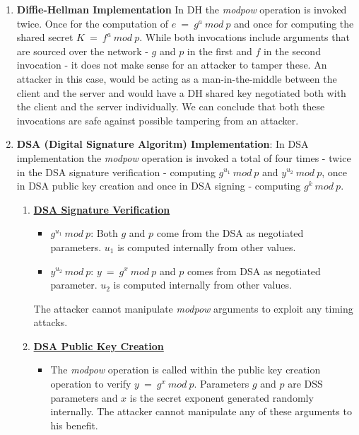 \documentclass{bhamthesis}
\begin{document}
\begin{enumerate}
    \item \textbf {Diffie-Hellman Implementation}
    In DH the \textit{modpow} operation is invoked twice. Once for the computation of \(e\ =\ g^a\ mod\ p\) and once for computing the shared secret \(K\ =\ f^a\ mod\ p\). While both invocations include arguments that are sourced over the network - \(g\) and \(p\) in the first and \(f\) in the second invocation - it does not make sense for an attacker to tamper these. An attacker in this case, would be acting as a man-in-the-middle between the client and the server and would have a DH shared key negotiated both with the client and the server individually. We can conclude that both these invocations are safe against possible tampering from an attacker.
    \item \textbf {DSA (Digital Signature Algoritm) Implementation}: 
    In DSA implementation the \textit{modpow} operation is invoked a total of four times - twice in the DSA signature verification - computing \(g^{u_1} \ mod \ p \) and \(y^{u_2}\ mod \ p\), once in DSA public key creation and once in DSA signing - computing \(g^k \ mod \ p\).\par
        \begin{enumerate}
        \item \textbf \underline{DSA Signature Verification}    \begin{itemize}
            \item {\(g^{u_1} \ mod \ p \)}: Both \(g\) and \(p\) come from the DSA as negotiated parameters. \(u_1\) is computed internally from other values.
            \item {\(y^{u_2} \ mod \ p \)}: \(y\ = \ g^x\ mod \ p\) and \(p\) comes from DSA as negotiated parameter. \(u_2\) is computed internally from other values.
         \end{itemize}
        The attacker cannot manipulate \textit{modpow} arguments to exploit any timing attacks.
        \item \textbf \underline{DSA Public Key Creation}
        \begin{itemize}
        \item
        The \textit{modpow} operation is called within the public key creation operation to verify \(y \ =\ g^x \ mod \ p\). Parameters \(g\) and \(p\) are DSS parameters and \(x\) is the secret exponent generated randomly internally. The attacker cannot manipulate any of these arguments to his benefit.
        \end{itemize}

\end{enumerate}
\end{enumerate}
\end{document}
